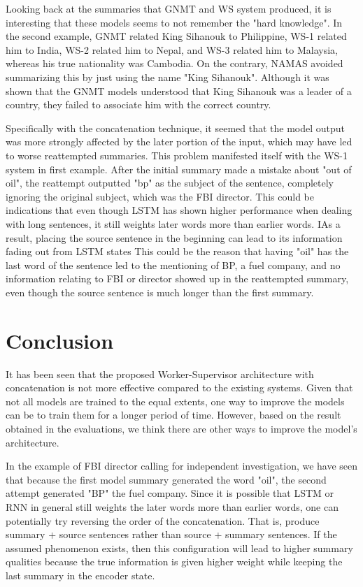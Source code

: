 \documentclass[letterpaper]{article} %
\begin{document}
Looking back at the summaries that GNMT and WS system produced, it is interesting that these models seems to not remember the "hard knowledge". In the second example, GNMT related King Sihanouk to Philippine, WS-1 related him to India, WS-2 related him to Nepal, and WS-3 related him to Malaysia, whereas his true nationality was Cambodia. On the contrary, NAMAS avoided summarizing this by just using the name "King Sihanouk". Although it was shown that the GNMT models understood that King Sihanouk was a leader of a country, they failed to associate him with the correct country.

Specifically with the concatenation technique, it seemed that the model output was more strongly affected by the later portion of the input, which may have led to worse reattempted summaries. This problem manifested itself with the WS-1 system in first example. After the initial summary made a mistake about "out of oil", the reattempt outputted "bp" as the subject of the sentence, completely ignoring the original subject, which was the FBI director. This could be indications that even though LSTM has shown higher performance when dealing with long sentences, it still weights later words more than earlier words. IAs a result, placing the source sentence in the beginning can lead to its information fading out from LSTM states This could be the reason that having "oil" has the last word of the sentence led to the mentioning of BP, a fuel company, and no information relating to FBI or director showed up in the reattempted summary, even though the source sentence is much longer than the first summary.

\section{Conclusion}
It has been seen that the proposed Worker-Supervisor architecture with concatenation is not more effective compared to the existing systems. Given that not all models are trained to the equal extents, one way to improve the models can be to train them for a longer period of time. However, based on the result obtained in the evaluations, we think there are other ways to improve the model's architecture.

In the example of FBI director calling for independent investigation, we have seen that because the first model summary generated the word "oil", the second attempt generated "BP" the fuel company. Since it is possible that LSTM or RNN in general still weights the later words more than earlier words, one can potentially try reversing the order of the concatenation. That is, produce summary + source sentences rather than source + summary sentences. If the assumed phenomenon exists, then this configuration will lead to higher summary qualities because the true information is given higher weight while keeping the last summary in the encoder state.
\end{document}
